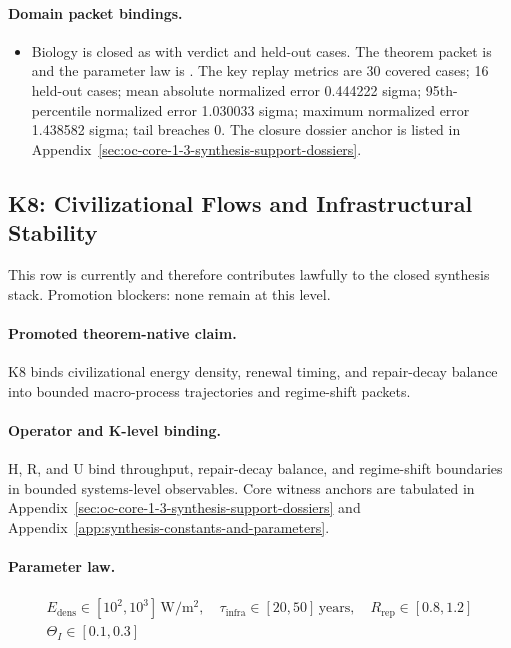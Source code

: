\paragraph{Domain packet bindings.}
\begin{itemize}[leftmargin=1.6em,nosep]
\item Biology is closed as  with verdict  and  held-out cases. The theorem packet is  and the parameter law is . The key replay metrics are 30 covered cases; 16 held-out cases; mean absolute normalized error 0.444222 sigma; 95th-percentile normalized error 1.030033 sigma; maximum normalized error 1.438582 sigma; tail breaches 0. The closure dossier anchor is listed in Appendix~\ref{sec:oc-core-1-3-synthesis-support-dossiers}.
\end{itemize}

\subsection{K8: Civilizational Flows and Infrastructural Stability}
\label{sec:oc-core-1-3-synthesis-k8}
This row is currently  and therefore contributes lawfully to the closed synthesis stack.
Promotion blockers: none remain at this level.

\paragraph{Promoted theorem-native claim.}
K8 binds civilizational energy density, renewal timing, and repair-decay balance into bounded macro-process trajectories and regime-shift packets.

\paragraph{Operator and K-level binding.}
H, R, and U bind throughput, repair-decay balance, and regime-shift boundaries in bounded systems-level observables.
Core witness anchors are tabulated in Appendix~\ref{sec:oc-core-1-3-synthesis-support-dossiers} and Appendix~\ref{app:synthesis-constants-and-parameters}.

\paragraph{Parameter law.}
\[
\begin{gathered} E_{\mathrm{dens}} \in [10^2,10^3]\,\mathrm{W/m^2},\quad \tau_{\mathrm{infra}} \in [20,50]\,\mathrm{years},\quad R_{\mathrm{rep}} \in [0.8,1.2] \\ \Theta_I \in [0.1,0.3] \end{gathered}
\]


